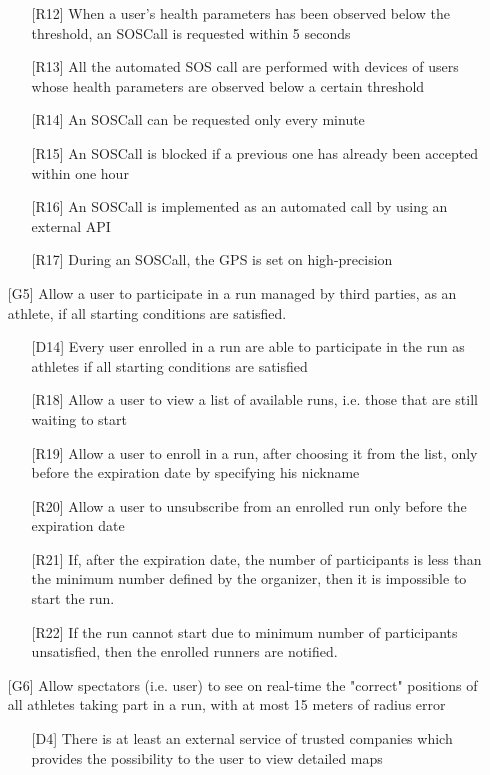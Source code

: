\begin{itemize}
\begin{itemize}
	\item[{[R12]}] When a user's health parameters has been observed below the threshold, an SOSCall is requested within 5 seconds
	\item[{[R13]}] All the automated SOS call are performed with devices of users whose health parameters are observed below a certain threshold
	\item[{[R14]}] An SOSCall can be requested only every minute
	\item[{[R15]}] An SOSCall is blocked if a previous one has already been accepted within one hour
	\item[{[R16]}] An SOSCall is implemented as an automated call by using an external API
	\item[{[R17]}] During an SOSCall, the GPS is set on high-precision
	\end{itemize}
\item[{[G5]}] Allow a user to participate in a run managed by third parties, as an athlete, if all starting conditions are satisfied.
	\begin{itemize}
	\item[{[D14]}] Every user enrolled in a run are able to participate in the run as athletes if all starting conditions are satisfied
	\item[{[R18]}] Allow a user to view a list of available runs, i.e. those that are still waiting to start 
	\item[{[R19]}] Allow a user to enroll in a run, after choosing it from the list, only before the expiration date by specifying his nickname
	\item[{[R20]}] Allow a user to unsubscribe from an enrolled run only before the expiration date
	\item[{[R21]}] If, after the expiration date, the number of participants is less than the minimum number defined by the organizer, then it is impossible to start the run.
	\item[{[R22]}] If the run cannot start due to minimum number of participants unsatisfied, then the enrolled runners are notified.
	\end{itemize}
\item[{[G6]}] Allow spectators (i.e. user) to see on real-time the "correct" positions of all athletes taking part in a run, with at most 15 meters of radius error
	\begin{itemize}
	\item[{[D4]}] There is at least an external service of trusted companies which provides the possibility to the user to view detailed maps

\end{itemize}
\end{itemize}
